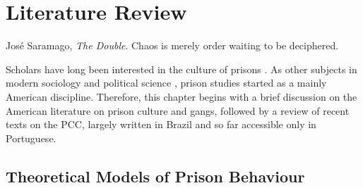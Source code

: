 \chapter{Literature Review}
\label{ch:chap2} 


\begin{chapquote}{Jos\'{e} Saramago, \textit{The Double}.}
Chaos is merely order waiting to be deciphered.
\end{chapquote}

Scholars have long been interested in the culture of prisons \citep[398]{hunt1993changes}. As other subjects in modern sociology and political science \citep[]{hoffmann2000american, munck2008passion}, prison studies started as a mainly American discipline. Therefore, this chapter begins with a brief discussion on the American literature on prison culture and gangs, followed by a review of recent texts on the PCC, largely written in Brazil and so far accessible only in Portuguese. 

\section{Theoretical Models of Prison Behaviour}

